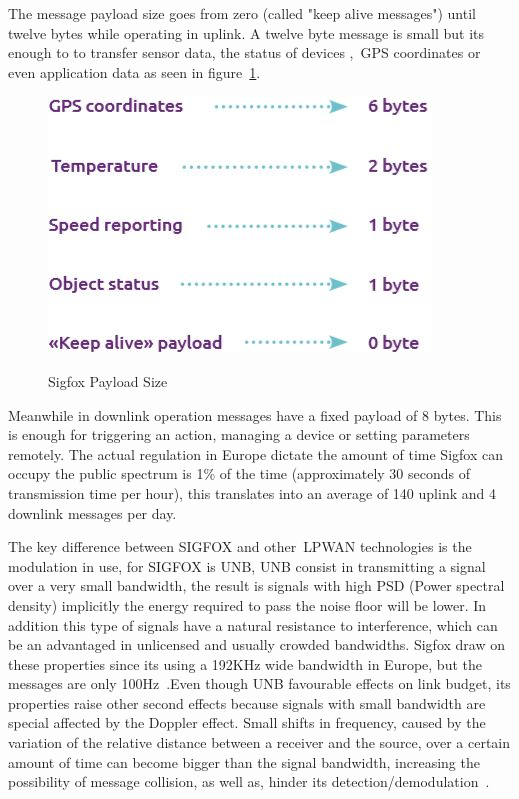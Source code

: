 The message payload size goes from zero (called "keep alive messages") until twelve bytes while operating in uplink. A twelve byte message is small but its enough to to transfer sensor data, the status of devices ,~\gls{GPS} coordinates or even application data as seen in figure~\ref{fig:SigFox_Payload_size}.\\
\begin{figure}[htbp]
  \centering
  
    {\includegraphics[width=0.5\linewidth]{Chapters/Figures/SigfoxSize.JPG}}%
 
  \caption{Sigfox Payload Size~\cite{SIGTECH}}
  \label{fig:SigFox_Payload_size}
\end{figure}
Meanwhile in downlink operation messages have a fixed payload of 8 bytes. This is enough for triggering an action, managing a device or setting parameters remotely. 
The actual regulation in Europe dictate the amount of time Sigfox can occupy the public spectrum is 1\% of the time (approximately 30 seconds of transmission time per hour), this translates into an average of 140 uplink and 4 downlink messages per day.

The key difference between SIGFOX and other~\gls{LPWAN} technologies is the modulation in use, for SIGFOX is UNB, UNB consist in transmitting a signal over a very small bandwidth, the result is signals with high PSD (Power spectral density) implicitly the energy required to pass the noise floor will be lower. In addition this type of signals have a natural resistance to interference, which can be an advantaged in unlicensed and usually crowded bandwidths. Sigfox draw on these properties since its using a 192KHz wide bandwidth in Europe, but the messages are only 100Hz~\cite{SIGTECH}.\newline Even though UNB favourable effects on link budget, its properties raise other second effects because signals with small bandwidth are special affected by the  Doppler effect. Small shifts in frequency, caused by the variation of the relative distance between a receiver and the source, over a certain amount of time can become bigger than the signal bandwidth, increasing the possibility of message collision, as well as, hinder its detection/demodulation~\cite{Anteur2016}.

